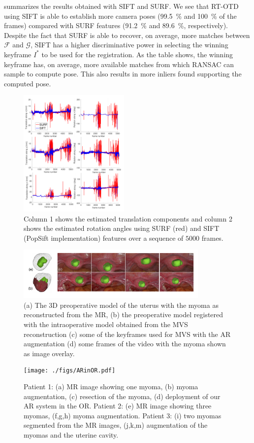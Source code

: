  summarizes the results obtained with SIFT and SURF. We see that RT-OTD using SIFT is able to establish more camera poses (\SI{99.5}{\percent} and \SI{100}{\percent} of the frames) compared with SURF features (\SI{91.2}{\percent} and \SI{89.6}{\percent}, respectively).
Despite the fact that SURF is able to recover, on average, more matches between $\mathcal{F}$ and $\mathcal{G}$, SIFT has a higher discriminative power in selecting the winning keyframe $I^*$ to be used for the registration. As the table shows, the winning keyframe has, on average, more available matches from which RANSAC can sample to compute pose. This also results in more inliers found supporting the computed pose.
\begin{figure}[t]
  \centering
  \includegraphics[width=0.48\textwidth]{./figs/Stability_Features.pdf}
\caption{Column 1 shows the estimated translation components and column 2 shows the estimated rotation angles using SURF (red) and SIFT (PopSift implementation) features over a sequence of $5000$ frames.}
\label{fig:SurfVsSift}
\vspace{-5mm}
\end{figure}

\begin{figure}[ht]
  \centering
  \includegraphics[width=0.835\textwidth]{./figs/frames_aug_new.pdf}
\caption{(a) The 3D preoperative model of the uterus with the  myoma as reconstructed from the MR, (b) the preoperative model registered with the intraoperative model obtained from the MVS reconstruction (c) some of the keyframes used for MVS with the AR augmentation  (d) some frames of the video with the myoma shown as image overlay.}
\label{fig:myomas}
\end{figure}
\begin{figure}[ht]
  \centering
  \texttt{[image: ./figs/ARinOR.pdf]}
\caption{Patient 1: (a) MR image showing one myoma, (b) myoma augmentation, (c) resection of the myoma, (d) deployment of our AR system in the OR. Patient 2: (e) MR image showing three myomas, (f,g,h) myoma augmentation. Patient 3: (i) two myomas segmented from the MR images, (j,k,m) augmentation of the myomas and the uterine cavity.}
\label{fig:realOR}
\end{figure}

